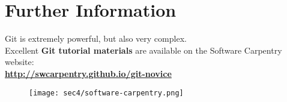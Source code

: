 \section{Further Information}\hypertarget{sec3}{}

\begin{frame}[fragile]
\emptyframetitle

  Git is extremely powerful, but also very complex.\\[0.5cm]

  Excellent \textbf{Git tutorial materials} are available on the Software Carpentry website:\\[0.5cm]
  \textbf{\url{http://swcarpentry.github.io/git-novice}}\\[0.5cm]

  \begin{figure}[h]
    \texttt{[image: sec4/software-carpentry.png]}
  \end{figure}


\end{frame}

